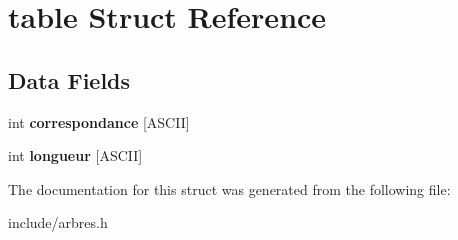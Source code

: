 \hypertarget{structtable}{}\section{table Struct Reference}
\label{structtable}
\subsection*{Data Fields}
\begin{DoxyCompactItemize}
\item 
\mbox{\label{structtable_a2564148ec43b891ae0710a3018c50294}} 
int {\bfseries correspondance} \mbox{[}A\+S\+C\+II\mbox{]}
\item 
\mbox{\label{structtable_ab0620c7fe85c2af91c4acf487c64d30d}} 
int {\bfseries longueur} \mbox{[}A\+S\+C\+II\mbox{]}
\end{DoxyCompactItemize}


The documentation for this struct was generated from the following file\+:\begin{DoxyCompactItemize}
\item 
include/arbres.\+h\end{DoxyCompactItemize}
